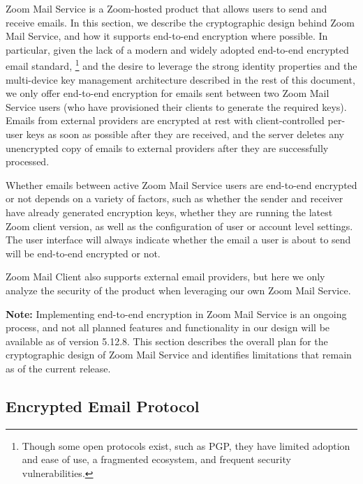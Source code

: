Zoom Mail Service is a Zoom-hosted product that allows users to send and receive emails. In this
section, we describe the cryptographic design behind Zoom Mail Service, and how it supports
end-to-end encryption where possible. In particular, given the lack of a modern and widely adopted
end-to-end encrypted email standard,%
% 
\footnote{Though some open protocols exist, such as PGP, they have limited adoption and ease of use,
a fragmented ecosystem, and frequent security vulnerabilities.}
%
and the desire to leverage the strong identity properties and the multi-device key management
architecture described in the rest of this document, we only offer end-to-end encryption for emails
sent between two Zoom Mail Service users (who have provisioned their clients to generate the
required keys). Emails from external providers are encrypted at rest with client-controlled per-user
keys as soon as possible after they are received, and the server deletes any unencrypted copy of
emails to external providers after they are successfully processed.

Whether emails between active Zoom Mail Service users are end-to-end encrypted or not depends on a
variety of factors, such as whether the sender and receiver have already generated encryption keys,
whether they are running the latest Zoom client version, as well as the configuration of user or
account level settings. The user interface will always indicate whether the email a user is about to
send will be end-to-end encrypted or not.

Zoom Mail Client also supports external email providers, but here we only analyze the security of
the product when leveraging our own Zoom Mail Service.

\textbf{Note:} Implementing end-to-end encryption in Zoom Mail Service is an ongoing process, and
not all planned features and functionality in our design will be available as of version 5.12.8.
This section describes the overall plan for the cryptographic design of Zoom Mail Service and
identifies limitations that remain as of the current release.

\subsection{Encrypted Email Protocol}
\label{subsec:emailprotocol}

